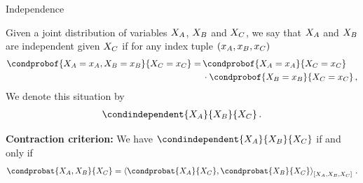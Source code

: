 \documentclass{beamer}
\begin{document}
    \begin{frame}{Independence}

        \begin{definition}
	        Given a joint distribution of variables $X_{A}$, $X_{B}$ and $X_{C}$, we say that $X_{A}$ and $X_{B}$ are independent given $X_{C}$ if for any index tuple $(x_{A},x_{B},x_{C})$
            \begin{align*}
                \condprobof{\indexedcatvariableof{\nodesa},\indexedcatvariableof{\nodesb}}{\indexedcatvariableof{\nodesc}}
                =  \, & \condprobof{\indexedcatvariableof{\nodesa}}{\indexedcatvariableof{\nodesc}}\\
                & \cdot \condprobof{\indexedcatvariableof{\nodesb}}{\indexedcatvariableof{\nodesc}}   \, ,
            \end{align*}
            We denote this situation by
            \begin{align*}
                \condindependent{\catvariableof{\nodesa}}{\catvariableof{\nodesb}}{\catvariableof{\nodesc}} \, .
            \end{align*}
        \end{definition}

            {\bf Contraction criterion:} We have $ \condindependent{\catvariableof{\nodesa}}{\catvariableof{\nodesb}}{\catvariableof{\nodesc}} $ if and only if
        \begin{align*}
            \condprobat{\catvariableof{\nodesa},\catvariableof{\nodesb}}{\catvariableof{\nodesc}}
            = \contractionof{
                \condprobat{\catvariableof{\nodesa}}{\catvariableof{\nodesc}},
                \condprobat{\catvariableof{\nodesb}}{\catvariableof{\nodesc}}
            }{\catvariableof{\nodesa},\catvariableof{\nodesb},\catvariableof{\nodesc}} \, .
        \end{align*}
    \end{frame}
\end{document}

